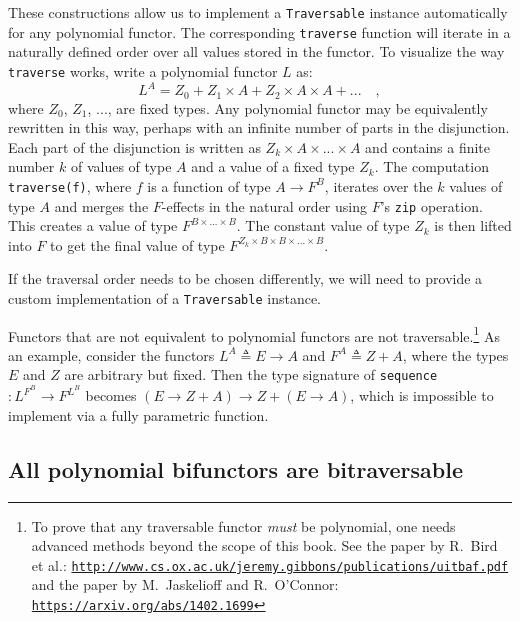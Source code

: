 These constructions allow us to implement a \lstinline!Traversable!
instance automatically for any polynomial functor. The corresponding
\lstinline!traverse! function will iterate in a naturally defined
order over all values stored in the functor. To visualize the way
\lstinline!traverse! works, write a polynomial functor $L$ as:
\[
L^{A}=Z_{0}+Z_{1}\times A+Z_{2}\times A\times A+...\quad,
\]
where $Z_{0}$, $Z_{1}$, ..., are fixed types. Any polynomial functor
may be equivalently rewritten in this way, perhaps with an infinite
number of parts in the disjunction. Each part of the disjunction is
written as $Z_{k}\times A\times...\times A$ and contains a finite
number $k$ of values of type $A$ and a value of a fixed type $Z_{k}$.
The computation \lstinline!traverse(f)!, where $f$ is a function
of type $A\rightarrow F^{B}$, iterates over the $k$ values of type
$A$ and merges the $F$-effects in the natural order using $F$\textsf{'}s
\lstinline!zip! operation. This creates a value of type $F^{B\times...\times B}$.
The constant value of type $Z_{k}$ is then lifted into $F$ to get
the final value of type $F^{Z_{k}\times B\times B\times...\times B}$.

If the traversal order needs to be chosen differently, we will need
to provide a custom implementation of a \lstinline!Traversable! instance.

Functors that are not equivalent to polynomial functors are not traversable.\footnote{To prove that any traversable functor \emph{must} be polynomial, one
needs advanced methods beyond the scope of this book. See the paper
by R.~Bird et al.: \texttt{\href{http://www.cs.ox.ac.uk/jeremy.gibbons/publications/uitbaf.pdf}{http://www.cs.ox.ac.uk/jeremy.gibbons/publications/uitbaf.pdf}}
and the paper by M.~Jaskelioff and R.~O\textsf{'}Connor: \texttt{\href{https://arxiv.org/abs/1402.1699}{https://arxiv.org/abs/1402.1699}}} As an example, consider the functors $L^{A}\triangleq E\rightarrow A$
and $F^{A}\triangleq Z+A$, where the types $E$ and $Z$ are arbitrary
but fixed. Then the type signature of \lstinline!sequence! $:L^{F^{B}}\rightarrow F^{L^{B}}$
becomes $(E\rightarrow Z+A)\rightarrow Z+(E\rightarrow A)$, which
is impossible to implement via a fully parametric function.

\subsection{All polynomial bifunctors are bitraversable\label{subsec:All-polynomial-bifunctors-are-bitraversable}}

